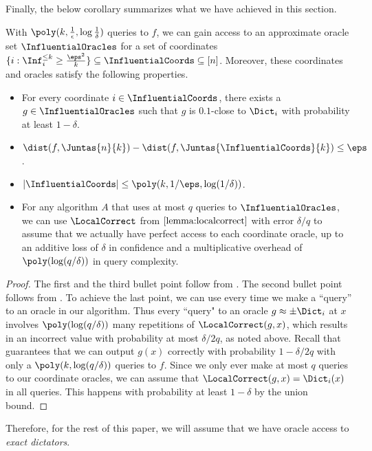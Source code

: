 Finally, the below corollary summarizes what we have achieved in this section.
\newcommand{\ideal}{\mathsf{ideal}}

   \begin{corollary}
    \label{corollary:approximate-to-exact-oracles}
    With $\poly(k, \frac{1}{\epsilon}, \log \frac{1}{\delta})$ queries to $f$, we can gain access to an approximate oracle set $\InfluentialOracles$ for a set of coordinates $\{i: \Inf_i^{\leq k}\geq \frac{\eps^2}{k}\} \subseteq \InfluentialCoords \subseteq [n]$. Moreover, these coordinates and oracles satisfy the following properties.  
    \begin{itemize}
        \item For every coordinate $i \in \InfluentialCoords$, there exists a $g \in \InfluentialOracles$ such that $g$ is $0.1$-close to $\Dict_i$ with probability at least $1-\delta$.
        \item $\dist(f, \Juntas{n}{k}) - \dist(f, \Juntas{\InfluentialCoords}{k}) \leq \eps$.
        \item $|\InfluentialCoords| \leq \poly(k,1/\eps, \log (1/\delta))$.
        \item For any algorithm $A$ that uses at most $q$ queries to $\InfluentialOracles$, we can use $\LocalCorrect$ from $\Cref{lemma:localcorrect}$ with error $\delta/q$ to assume that we actually have perfect access to each coordinate oracle, up to an additive loss of $\delta$ in confidence and a multiplicative overhead of $\poly(\log(q/\delta))$ in query complexity.
    \end{itemize}
\end{corollary}
\begin{proof}
The first and the third bullet point follow from . The second bullet point follows from . To achieve the last point, we can use  every time we make a ``query'' to an oracle in our algorithm. Thus every ``query" to an oracle $g\approx \pm \Dict_i$ at $x$ involves $\poly(\log(q/\delta))$ many repetitions of $\LocalCorrect(g,x)$, which results in an incorrect value with probability at most $\delta/2q$, as noted above. Recall that  guarantees that we can output $g(x)$ correctly with probability $1-\delta/2q$ with only a $\poly(k,\log(q/\delta))$ queries to $f$. 
Since we only ever make at most $q$ queries to our coordinate oracles, we can assume that $\LocalCorrect(g,x) =  \Dict_i(x)$ in all queries.
This happens with probability at least $1-\delta$ by the union bound.
\end{proof}
Therefore, for the rest of this paper, we will assume that we have oracle access to \textit{exact dictators}.


